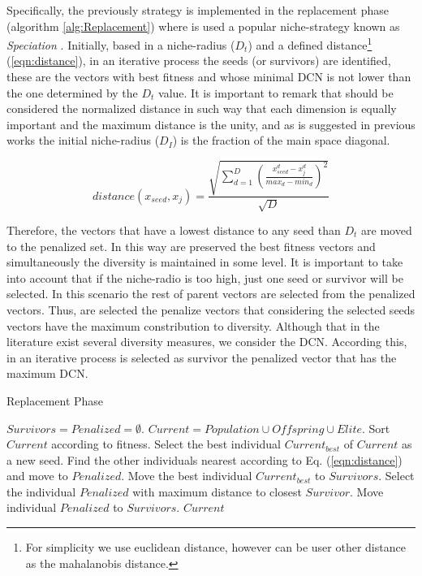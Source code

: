%
Specifically, the previously strategy is implemented in the replacement phase (algorithm \ref{alg:Replacement}) where is used a popular niche-strategy known as \textit{Speciation} \cite{yang2017multimodal}.
%
Initially, based in a niche-radius ($D_t$) and a defined distance\footnote{For simplicity we use euclidean distance, however can be user other distance as the mahalanobis distance.} (\ref{eqn:distance}), in an iterative process the seeds (or survivors) are identified, these are the vectors with best fitness and whose minimal DCN is not lower than the one determined by the $D_t$ value.
%
It is important to remark that should be considered the normalized distance in such way that each dimension is equally important and the maximum distance is the unity, and as is suggested in previous works the initial niche-radius ($D_I$) is the fraction of the main space diagonal.

\begin{equation}\label{eqn:distance}
distance ( x_{seed}, x_j ) = \frac{\sqrt{ \sum_{d=1}^D \left ( \frac{x_{seed}^d - x_j^d}{max_d - min_d} \right )^2  }} {\sqrt{D}}
\end{equation}

%
Therefore, the vectors that have a lowest distance to any seed than $D_t$ are moved to the penalized set.
%
In this way are preserved the best fitness vectors and simultaneously the diversity is maintained in some level.
%
It is important to take into account that if the niche-radio is too high, just one seed or survivor will be selected.
%
In this scenario the rest of parent vectors are selected from the penalized vectors.
%
Thus, are selected the penalize vectors that considering the selected seeds vectors have the maximum constribution to diversity.
%
Although that in the literature exist several diversity measures, we consider the DCN.
%
According this, in an iterative process is selected as survivor the penalized vector that has the maximum DCN.

\begin{algorithm}[H]
  \scriptsize
	\caption{Replacement Phase} \label{alg:Replacement}
	\begin{algorithmic}[1]
	\STATE $Survivors = Penalized = \emptyset$.
	\STATE $Current = Population \cup Offspring \cup Elite$.
	\STATE Sort $Current$ according to fitness.
	   \STATE Select the best individual $Current_{best}$ of $Current$ as a new seed.
	   \STATE Find the other individuals nearest according to Eq. (\ref{eqn:distance}) and move to $Penalized$.
	   \STATE Move the best individual $Current_{best}$ to $Survivors$.
	\ENDWHILE
	   \STATE Select the individual $Penalized$ with maximum distance to closest $Survivor$.
	   \STATE Move individual $Penalized$ to $Survivors$.
	\ENDWHILE
       \RETURN $Current$
\end{algorithmic}
\end{algorithm}

